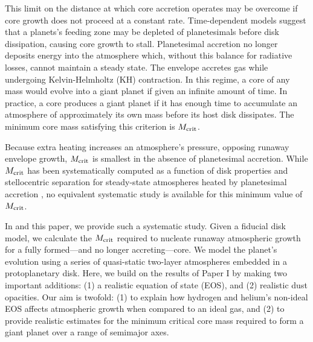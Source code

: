 
This limit on the distance at which core accretion operates may be overcome if core growth does not proceed at a constant rate. Time-dependent models \citep[e.g.,][]{pollack96,ikoma00} suggest that a planets's feeding zone may be depleted of planetesimals before disk dissipation, causing core growth to stall. Planetesimal accretion no longer deposits energy into the atmosphere which, without this balance for radiative losses, cannot maintain a steady state.  The envelope accretes gas while  undergoing Kelvin-Helmholtz (KH) contraction.  In this regime, a core of any mass would evolve into a giant planet if given an infinite amount of time.  In practice, a core produces a giant planet if it has enough time to accumulate an atmosphere of approximately its own mass before its host disk dissipates.  The minimum core mass satisfying this criterion is $M_{\rm crit}$.

Because extra heating increases an atmosphere's pressure, opposing runaway envelope growth,  $M_{\rm crit}$ is smallest in the absence of planetesimal accretion.
 While $M_{\rm crit}$ has been systematically computed as a function of disk properties and stellocentric separation for steady-state atmospheres heated by planetesimal accretion \citep{rafikov06}, no equivalent systematic study is available for this minimum value of $M_{\rm crit}$.

In \citet[hereafter Paper I]{piso14} and this paper, we provide such a systematic study.   Given a fiducial disk model, we calculate the $M_{\rm crit}$ required to nucleate runaway atmospheric growth for a fully formed---and no longer accreting---core.  We model the planet's evolution using a series of quasi-static two-layer atmospheres embedded in a protoplanetary disk. Here, we build on the results of Paper I by making two important additions: (1) a realistic equation of state (EOS), and (2) realistic dust opacities.  Our aim is twofold: (1) to explain how hydrogen and helium's non-ideal EOS affects atmospheric growth when compared to an ideal gas, and (2) to provide realistic estimates for the minimum critical core mass required to form a giant planet over a range of semimajor axes. 




